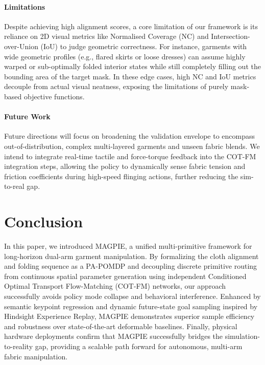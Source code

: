 \documentclass[journal]{IEEEtran}
\begin{document}
\paragraph{Limitations}
Despite achieving high alignment scores, a core limitation of our framework is its reliance on 2D visual metrics like Normalised Coverage (NC) and Intersection-over-Union (IoU) to judge geometric correctness. For instance, garments with wide geometric profiles (e.g., flared skirts or loose dresses) can assume highly warped or sub-optimally folded interior states while still completely filling out the bounding area of the target mask. In these edge cases, high NC and IoU metrics decouple from actual visual neatness, exposing the limitations of purely mask-based objective functions.

\paragraph{Future Work}
Future directions will focus on broadening the validation envelope to encompass out-of-distribution, complex multi-layered garments and unseen fabric blends. We intend to integrate real-time tactile and force-torque feedback into the COT-FM integration steps, allowing the policy to dynamically sense fabric tension and friction coefficients during high-speed flinging actions, further reducing the sim-to-real gap.


\section{Conclusion}
\label{sec:conclusion}

In this paper, we introduced MAGPIE, a unified multi-primitive framework for long-horizon dual-arm garment manipulation. By formalizing the cloth alignment and folding sequence as a PA-POMDP and decoupling discrete primitive routing from continuous spatial parameter generation using independent Conditioned Optimal Transport Flow-Matching (COT-FM) networks, our approach successfully avoids policy mode collapse and behavioral interference. Enhanced by semantic keypoint regression and dynamic future-state goal sampling inspired by Hindsight Experience Replay, MAGPIE demonstrates superior sample efficiency and robustness over state-of-the-art deformable baselines. Finally, physical hardware deployments confirm that MAGPIE successfully bridges the simulation-to-reality gap, providing a scalable path forward for autonomous, multi-arm fabric manipulation.
\end{document}

